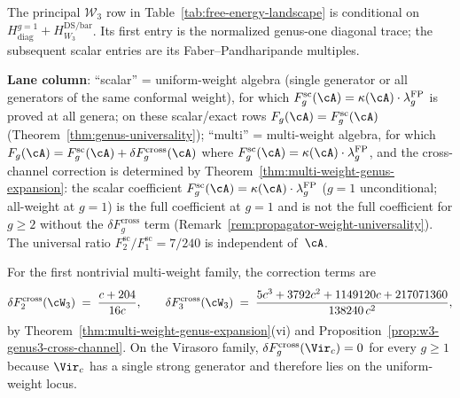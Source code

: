 \noindent
The principal $\mathcal W_3$ row in
Table~\ref{tab:free-energy-landscape} is conditional on
$H_{\mathrm{diag}}^{g=1}+H_{W_3}^{\mathrm{DS/bar}}$.  Its first
entry is the normalized genus-one diagonal trace; the subsequent
scalar entries are its Faber--Pandharipande multiples.

\noindent
\textbf{Lane column}: ``scalar'' = uniform-weight algebra (single generator or
all generators of the same conformal weight), for which
$F_g^{\mathrm{sc}}(\cA)=\kappa(\cA) \cdot \lambda_g^{\mathrm{FP}}$
is proved at all genera; on these scalar/exact rows
$F_g(\cA)=F_g^{\mathrm{sc}}(\cA)$
(Theorem~\ref{thm:genus-universality});
``multi'' = multi-weight algebra, for which
$F_g(\cA)=F_g^{\mathrm{sc}}(\cA)+\delta F_g^{\mathrm{cross}}(\cA)$
where
$F_g^{\mathrm{sc}}(\cA)=\kappa(\cA) \cdot \lambda_g^{\mathrm{FP}}$,
and the cross-channel correction is determined by
Theorem~\ref{thm:multi-weight-genus-expansion}: the scalar coefficient
$F_g^{\mathrm{sc}}(\cA)=\kappa(\cA) \cdot \lambda_g^{\mathrm{FP}}$
($g{=}1$ unconditional; all-weight at $g{=}1$) is the full coefficient
at $g=1$ and is not the full coefficient for $g \ge 2$ without the
$\delta F_g^{\mathrm{cross}}$ term
(Remark~\ref{rem:propagator-weight-universality}). The universal ratio
$F_2^{\mathrm{sc}}/F_1^{\mathrm{sc}} = 7/240$ is independent of~$\cA$.

\smallskip\noindent
For the first nontrivial multi-weight family, the correction terms are
\[
\delta F_2^{\mathrm{cross}}(\cW_3)
\;=\;
\frac{c+204}{16c},
\qquad
\delta F_3^{\mathrm{cross}}(\cW_3)
\;=\;
\frac{5c^3 + 3792c^2 + 1149120c + 217071360}{138240\,c^2},
\]
by Theorem~\ref{thm:multi-weight-genus-expansion}\textup{(vi)} and
Proposition~\ref{prop:w3-genus3-cross-channel}. On the Virasoro
family, $\delta F_g^{\mathrm{cross}}(\Vir_c)=0$ for every $g \ge 1$
because $\Vir_c$ has a single strong generator and therefore lies on
the uniform-weight locus.

